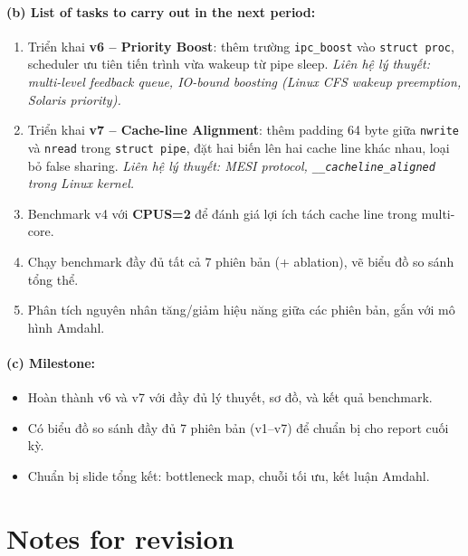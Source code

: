 \documentclass[11pt,a4paper]{article}
\begin{document}
\paragraph{(b) List of tasks to carry out in the next period:}
\begin{enumerate}
  \item Triển khai \textbf{v6 -- Priority Boost}: thêm trường \texttt{ipc\_boost} vào \texttt{struct proc}, scheduler ưu tiên tiến trình vừa wakeup từ pipe sleep. \emph{Liên hệ lý thuyết: multi-level feedback queue, IO-bound boosting (Linux CFS wakeup preemption, Solaris priority).}
  \item Triển khai \textbf{v7 -- Cache-line Alignment}: thêm padding 64 byte giữa \texttt{nwrite} và \texttt{nread} trong \texttt{struct pipe}, đặt hai biến lên hai cache line khác nhau, loại bỏ false sharing. \emph{Liên hệ lý thuyết: MESI protocol, \texttt{\_\_cacheline\_aligned} trong Linux kernel.}
  \item Benchmark v4 với \textbf{CPUS=2} để đánh giá lợi ích tách cache line trong multi-core.
  \item Chạy benchmark đầy đủ tất cả 7 phiên bản (+ ablation), vẽ biểu đồ so sánh tổng thể.
  \item Phân tích nguyên nhân tăng/giảm hiệu năng giữa các phiên bản, gắn với mô hình Amdahl.
\end{enumerate}

\paragraph{(c) Milestone:}
\begin{itemize}
  \item Hoàn thành v6 và v7 với đầy đủ lý thuyết, sơ đồ, và kết quả benchmark.
  \item Có biểu đồ so sánh đầy đủ 7 phiên bản (v1--v7) để chuẩn bị cho report cuối kỳ.
  \item Chuẩn bị slide tổng kết: bottleneck map, chuỗi tối ưu, kết luận Amdahl.
\end{itemize}

\section{Notes for revision}
\end{document}
